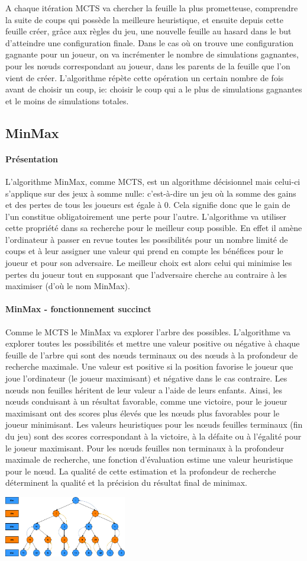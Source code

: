 A chaque itération MCTS va chercher la feuille la plus prometteuse, comprendre la suite de coups qui possède la meilleure heuristique, 
et ensuite depuis cette feuille créer, grâce aux règles du jeu, une nouvelle feuille au hasard dans le but d'atteindre une configuration finale.
Dans le cas où on trouve une configuration gagnante pour un joueur, on va incrémenter le nombre de simulations gagnantes, pour les nœuds
correspondant au joueur, dans les parents de la feuille que l'on vient de créer.
L'algorithme répète cette opération un certain nombre de fois avant de choisir un coup, ie: choisir le coup qui a le plus de simulations
gagnantes et le moins de simulations totales.



\subsection{MinMax}

\paragraph{Présentation}
L'algorithme MinMax, comme MCTS, est un algorithme décisionnel mais celui-ci s'applique sur des jeux à somme nulle: c'est-à-dire
un jeu où la somme des gains et des pertes de tous les joueurs est égale à 0. Cela signifie donc que le gain de l'un constitue 
obligatoirement une perte pour l'autre. L'algorithme va utiliser cette propriété dans sa recherche pour le meilleur coup possible.
En effet il amène l'ordinateur à passer en revue toutes les possibilités pour un nombre limité de coups et à leur assigner une valeur 
qui prend en compte les bénéfices pour le joueur et pour son adversaire. Le meilleur choix est alors celui qui minimise les pertes 
du joueur tout en supposant que l'adversaire cherche au contraire à les maximiser (d'où le nom MinMax).

\paragraph{MinMax - fonctionnement succinct}
Comme le MCTS le MinMax va explorer l'arbre des possibles. L'algorithme va explorer toutes les possibilités et mettre une valeur positive ou négative
à chaque feuille de l'arbre qui sont des nœuds terminaux ou des nœuds à la profondeur de recherche maximale.
Une valeur est positive si la position favorise le joueur que joue l'ordinateur (le joueur maximisant) et négative dans le cas contraire.
Les nœuds non feuilles héritent de leur valeur a l'aide de leurs enfants.
Ainsi, les nœuds conduisant à un résultat favorable, comme une victoire, pour le joueur maximisant ont des scores plus élevés que les nœuds 
plus favorables pour le joueur minimisant. Les valeurs heuristiques pour les nœuds feuilles terminaux (fin du jeu) sont des scores correspondant 
à la victoire, à la défaite ou à l'égalité pour le joueur maximisant. Pour les nœuds feuilles non terminaux à la profondeur maximale de recherche, 
une fonction d'évaluation estime une valeur heuristique pour le nœud. La qualité de cette estimation et la profondeur de recherche déterminent la 
qualité et la précision du résultat final de minimax.

\includegraphics[width=0.4\textwidth]{root/MinMax.jpeg}